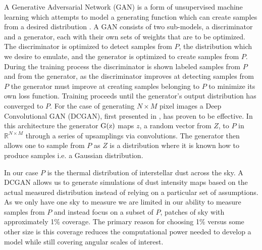 \documentclass[twocolumn]{aastex62}
\begin{document}
A Generative Adversarial Network (GAN) is a form of unsupervised machine learning which attempts to model a generating function which can create samples from a desired distribution \citep{goodfellow14}. 
A GAN consists of two sub-models, a discriminator and a generator, each with their own sets of weights that are to be optimized.
The discriminator is optimized to detect samples from $P$, the distribution which we desire to emulate, and the generator is optimized to create samples from $P$.
During the training process the discriminator is shown labeled samples from $P$ and from the generator, as the discriminator improves at detecting samples from $P$ the generator must improve at creating samples belonging to $P$ to minimize its own loss function. Training proceeds until the generator's output distribution has converged to $P$.
For the case of generating $N\times M$ pixel images a Deep Convolutional GAN (DCGAN), first presented in \cite{radford15}, has proven to be effective. In this architecture the generator $\rm{G}(z)$ maps $z$, a random vector from $Z$, to $P$ in $\mathbb{R}^{N\times M}$ through a series of upsamplings via convolutions. 
The generator then allows one to sample from $P$ as $Z$ is a distribution where it is known how to produce samples i.e. a Gaussian distribution.

In our case $P$ is the thermal distribution of interstellar dust across the sky.
A DCGAN allows us to generate simulations of dust intensity maps based on the actual measured distribution instead of relying on a particular set of assumptions. 
As we only have one sky to measure we are limited in our ability to measure samples from $P$ and instead focus on a subset of $P$, patches of sky with approximately 1\% coverage. 
The primary reason for choosing 1\% versus some other size is this coverage reduces the computational power needed to develop a model while still covering angular scales of interest.
\end{document}
